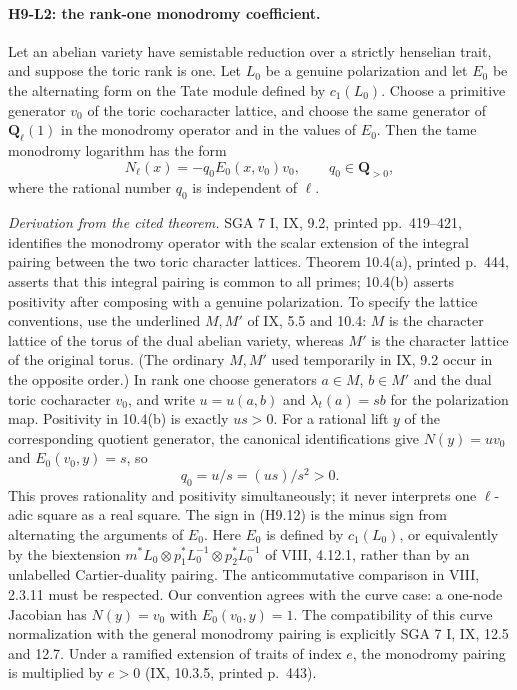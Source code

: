 \documentclass[11pt,a4paper]{article}
\begin{document}
\paragraph{H9-L2: the rank-one monodromy coefficient.}
Let an abelian variety have semistable reduction over a strictly
henselian trait, and suppose the toric rank is one. Let $L_0$ be a
genuine polarization and let $E_0$ be the alternating form on the Tate
module defined by $c_1(L_0)$. Choose a primitive generator $v_0$ of the
toric cocharacter lattice, and choose the same generator of
$\mathbf Q_\ell(1)$ in the monodromy operator and in the values of $E_0$.
Then the tame monodromy logarithm has the form
\[
 N_\ell(x)=-q_0 E_0(x,v_0)v_0,\qquad q_0\in\mathbf Q_{>0},
                                                        \tag{H9.12}
\]
where the rational number $q_0$ is independent of $\ell$.

\emph{Derivation from the cited theorem.} SGA 7 I, IX, 9.2, printed
pp.~419--421, identifies
the monodromy operator with the scalar extension of the integral
pairing between the two toric character lattices. Theorem 10.4(a),
printed p.~444, asserts that this integral pairing is common to all
primes; 10.4(b) asserts positivity after composing with a genuine
polarization. To specify the lattice conventions, use the underlined
$M,M'$ of IX, 5.5 and 10.4: $M$ is the character lattice of the torus
of the dual abelian variety, whereas $M'$ is the character lattice
of the original torus. (The ordinary $M,M'$ used temporarily in
IX, 9.2 occur in the opposite order.) In rank one choose generators
$a\in M$, $b\in M'$ and the dual toric cocharacter $v_0$, and write
$u=u(a,b)$ and $\lambda_t(a)=s b$ for the polarization map.
Positivity in 10.4(b) is exactly $us>0$.
For a rational lift $y$ of the corresponding quotient generator,
the canonical identifications give $N(y)=u v_0$ and
$E_0(v_0,y)=s$, so
\[
 q_0=u/s=(us)/s^2>0.
\]
This proves rationality and positivity simultaneously; it never interprets
one $\ell$-adic square as a real square. The sign in (H9.12) is the minus
sign from alternating the arguments of $E_0$. Here $E_0$ is defined
by $c_1(L_0)$, or equivalently by the biextension
$m^*L_0\otimes p_1^*L_0^{-1}\otimes p_2^*L_0^{-1}$ of
VIII, 4.12.1, rather than by an unlabelled Cartier-duality pairing.
The anticommutative comparison in VIII, 2.3.11 must be respected.
Our convention agrees with the curve
case: a one-node Jacobian has $N(y)=v_0$ with
$E_0(v_0,y)=1$. The compatibility of this curve normalization with
the general monodromy pairing is explicitly SGA 7 I, IX, 12.5 and 12.7.
Under a ramified extension of traits of index $e$, the monodromy pairing
is multiplied by $e>0$ (IX, 10.3.5, printed p.~443).
\end{document}

